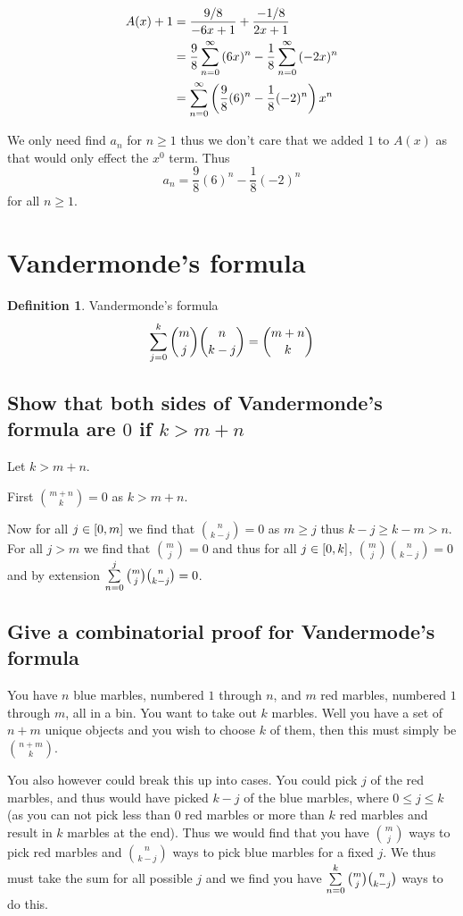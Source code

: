 \documentclass{article}
\theoremstyle{definition}
\newtheorem{definition}{Definition}[section]
\begin{document}
	\begin{align*}
		A(x) + 1 &= \frac{9/8}{-6x+1} + \frac{-1/8}{2x+1} \\
		&= \frac98\sum\limits_{n=0}^{\infty}  {(6x)^n}  - \frac18\sum\limits_{n=0}^{\infty}  {(-2x)^n}  \\
		&= \sum\limits_{n=0}^{\infty}  {\left(\frac98(6)^n-\frac18(-2)^n\right)x^n} 
	\end{align*}
	
	We only need find $a_n$ for $n \ge 1$ thus we don't care that we added $1$ to $A(x)$ as that would only effect the $x^0$ term. Thus $$a_n = \frac98(6)^n-\frac18(-2)^n$$ for all $n\ge 1$.
	
	
	\section{Vandermonde's formula}
	\begin{definition}{Vandermonde's formula}
		$$\sum\limits_{j=0}^{k}  {\binom{m}{j}\binom{n}{k-j}} =\binom{m+n}{k}$$
	\end{definition}
	\subsection{Show that both sides of Vandermonde's formula are $0$ if $k > m + n$}
	
	Let $k > m + n$.
	
	First $\binom{m+n}k = 0$ as $k > m+n$.
	
	Now for all $j \in \left[ {0} , {m} \right]$ we find that $\binom n{k-j} = 0$ as $m \ge j$ thus $k - j \ge k - m > n$. For all $j > m$ we find that $\binom mj=0$ and thus for all $j \in \left[ {0} , {k} \right]$, $\binom mj\binom n{k-j} = 0$ and by extension $\sum\limits_{n=0}^{j}  {\binom mj\binom n{k-j}}  = 0$.
	
	\subsection{Give a combinatorial proof for Vandermode's formula}
	
	You have $n$ blue marbles, numbered $1$ through $n$, and $m$ red marbles, numbered $1$ through $m$, all in a bin. You want to take out $k$ marbles. Well you have a set of $n+m$ unique objects and you wish to choose $k$ of them, then this must simply be $\binom{n+m}k$. 
	
	You also however could break this up into cases. You could pick $j$ of the red marbles, and thus would have picked $k-j$ of the blue marbles, where $0 \le j \le k$ (as you can not pick less than $0$ red marbles or more than $k$ red marbles and result in $k$ marbles at the end). Thus we would find that you have $\binom mj$ ways to pick red marbles and $\binom n{k-j}$ ways to pick blue marbles for a fixed $j$. We thus must take the sum for all possible $j$ and we find you have $\sum\limits_{n=0}^{k}  {\binom mj\binom n{k-j}} $ ways to do this.
	
\end{document}
